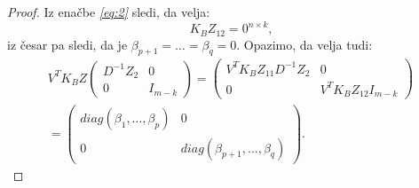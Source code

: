 \documentclass[mat1]{article}
\begin{document}
\begin{proof}
Iz enačbe \textit{\eqref{eq:2}} sledi, da velja:
$$
K_B Z_{12} = 0^{n \times k} \text{,}
$$
iz česar pa sledi, da je $\beta_{p+1} = \ldots = \beta_{q} = 0$.
Opazimo, da velja tudi:
\begin{gather*}
V^T K_B Z
\begin{pmatrix}
D^{-1} Z_2 & 0\\ 
0 & I_{m-k}
\end{pmatrix} = 
\begin{pmatrix}
V^T K_B Z_{11} D^{-1} Z_2 & 0\\ 
0 & V^T K_B Z_{12} I_{m-k}
\end{pmatrix} \\ =
\begin{pmatrix}
diag(\beta_1, \ldots, \beta_p) & 0\\ 
0 & diag(\beta_{p+1}, \ldots, \beta_q)
\end{pmatrix} \text{.}
\end{gather*}


\end{proof}
\end{document}

